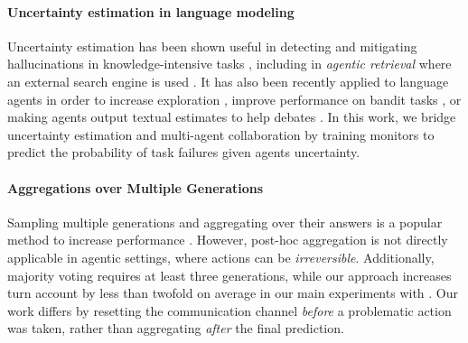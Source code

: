 \paragraph{Uncertainty estimation in language modeling} Uncertainty estimation has been shown useful in detecting and mitigating hallucinations in knowledge-intensive tasks \cite{kadavath2022languagemodelsmostlyknow, yona-etal-2024-large, ivgi2024from}, including in \emph{agentic retrieval}  where an external search engine is used \cite{jiang-etal-2023-active, han-etal-2024-towards}.
It has also been recently applied to language agents in order to increase exploration \cite{rahn2024controlling}, improve performance on bandit tasks \cite{felicioni2024on}, or making agents output textual estimates to help debates \cite{debunc}. In this work, we bridge uncertainty estimation and multi-agent collaboration by training monitors to predict the probability of task failures given agents uncertainty.



\paragraph{Aggregations over Multiple Generations}

Sampling multiple generations and aggregating over their answers is a popular method to increase performance \cite{wang2023selfconsistency, yoran-etal-2023-answering, du2023improvingfactualityreasoninglanguage, chen2024universal, min2024beyond}.
However, post-hoc aggregation is not directly applicable in agentic settings, where actions can be \emph{irreversible}.
Additionally, majority voting \cite{wang2023selfconsistency} requires at least three generations, while our approach increases turn account by less than twofold on average in our main experiments with \ourenv{}.
Our work differs by resetting the communication channel \emph{before} a problematic action was taken, rather than aggregating \emph{after} the final prediction.
